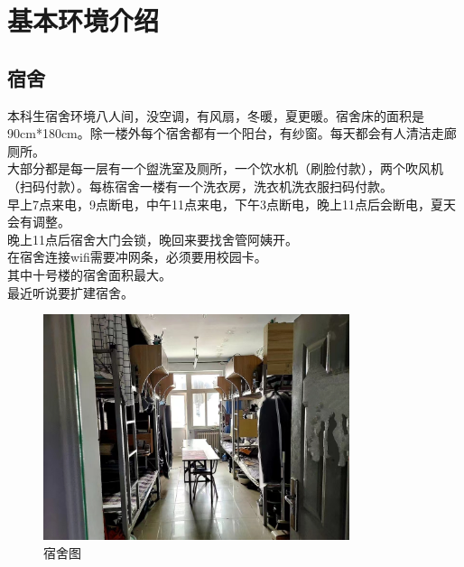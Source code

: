 \documentclass[12pt]{article} %
\begin{document}
	
\section{基本环境介绍} 
	\subsection{宿舍} %
本科生宿舍环境八人间，没空调，有风扇，冬暖，夏更暖。宿舍床的面积是90cm*180cm。除一楼外每个宿舍都有一个阳台，有纱窗。每天都会有人清洁走廊厕所。\\

大部分都是每一层有一个盥洗室及厕所，一个饮水机（刷脸付款），两个吹风机（扫码付款）。每栋宿舍一楼有一个洗衣房，洗衣机洗衣服扫码付款。\\

早上7点来电，9点断电，中午11点来电，下午3点断电，晚上11点后会断电，夏天会有调整。\\

晚上11点后宿舍大门会锁，晚回来要找舍管阿姨开。\\

在宿舍连接wifi需要冲网条，必须要用校园卡。\\

其中十号楼的宿舍面积最大。\\

最近听说要扩建宿舍。


	\begin{figure}[!h]
	\centering
	\includegraphics[width=0.8\textwidth]{20240717155725.jpg}
	\caption{宿舍图} %
\end{figure}

		\newpage
\end{document}
